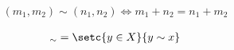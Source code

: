 

\begin{align}\label{eq:einf-Z aus N 1}
(m_1,m_2) \sim (n_1,n_2) \iff m_1+n_2 = n_1 + m_2
\end{align}

\begin{align*}
[x]_\sim = \setc{y \in X}{y \sim x}
\end{align*}


